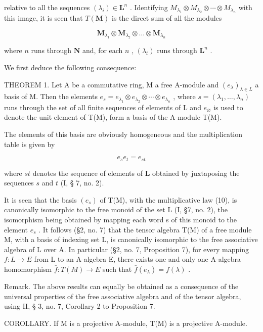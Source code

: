 relative to all the sequences \((\lambda_{i})\in\mathbf{L}^{n}\) . Identifying \(M_{\lambda_{1}}\otimes M_{\lambda_{2}}\otimes\cdots\otimes M_{\lambda_{n}}\) with this image, it is seen that \(T(\mathbf{M})\) is the direct sum of all the modules

\[
\mathbf {M} _ {\lambda_ {1}} \otimes \mathbf {M} _ {\lambda_ {2}} \otimes \dots \otimes \mathbf {M} _ {\lambda_ {n}}
\]

where \(n\) runs through \(\mathbf{N}\) and, for each \(n\) , \((\lambda_t)\) runs through \(\mathbf{L}^n\) .

We first deduce the following consequence:

THEOREM 1. Let A be a commutative ring, M a free A-module and \((e_{\lambda})_{\lambda \in L}\) a basis of M. Then the elements \(e_{s} = e_{\lambda_{1}} \otimes e_{\lambda_{2}} \otimes \cdots \otimes e_{\lambda_{n}}\) , where \(s = (\lambda_{1}, \ldots, \lambda_{n})\) runs through the set of all finite sequences of elements of L and \(e_{\varnothing}\) is used to denote the unit element of T(M), form a basis of the A-module T(M).

The elements of this basis are obviously homogeneous and the multiplication table is given by

\[
e _ {s} e _ {t} = e _ {s t}\tag{10}
\]

where \(st\) denotes the sequence of elements of \(\mathbf{L}\) obtained by juxtaposing the sequences \(s\) and \(t\) (I, § 7, no. 2).

It is seen that the basis \((e_{s})\) of T(M), with the multiplicative law (10), is canonically isomorphic to the free monoid of the set L (I, §7, no. 2), the isomorphism being obtained by mapping each word s of this monoid to the element \(e_{s}\) . It follows (§2, no. 7) that the tensor algebra T(M) of a free module M, with a basis of indexing set L, is canonically isomorphic to the free associative algebra of L over A. In particular (§2, no. 7, Proposition 7), for every mapping \(f: L \to E\) from L to an A-algebra E, there exists one and only one A-algebra homomorphism \(\bar{f}: T(M) \to E\) such that \(\bar{f}(e_{\lambda}) = f(\lambda)\) .

Remark. The above results can equally be obtained as a consequence of the universal properties of the free associative algebra and of the tensor algebra, using II, § 3, no. 7, Corollary 2 to Proposition 7.

COROLLARY. If M is a projective A-module, T(M) is a projective A-module.

